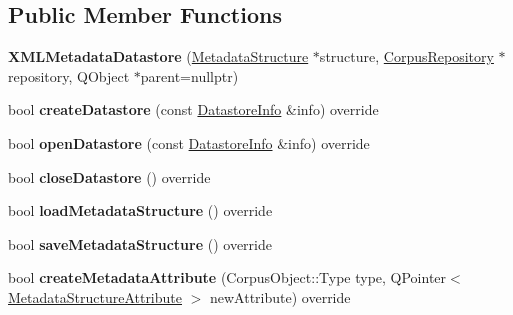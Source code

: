 \subsection*{Public Member Functions}
\begin{DoxyCompactItemize}
\item 
\mbox{\label{class_x_m_l_metadata_datastore_a1f990239b086258a4dbd5f70a4e66daf}} 
{\bfseries X\+M\+L\+Metadata\+Datastore} (\hyperlink{class_metadata_structure}{Metadata\+Structure} $\ast$structure, \hyperlink{class_corpus_repository}{Corpus\+Repository} $\ast$repository, Q\+Object $\ast$parent=nullptr)
\item 
\mbox{\label{class_x_m_l_metadata_datastore_aa6400d415ec4967ec83e2fca309143a3}} 
bool {\bfseries create\+Datastore} (const \hyperlink{class_datastore_info}{Datastore\+Info} \&info) override
\item 
\mbox{\label{class_x_m_l_metadata_datastore_aadeabc52b42f14af20fccd66e2cebb0e}} 
bool {\bfseries open\+Datastore} (const \hyperlink{class_datastore_info}{Datastore\+Info} \&info) override
\item 
\mbox{\label{class_x_m_l_metadata_datastore_ae0a7e5222115f773f4b56cfe80a381a2}} 
bool {\bfseries close\+Datastore} () override
\item 
\mbox{\label{class_x_m_l_metadata_datastore_ac09c925e904379d14fafe1c8f561ceab}} 
bool {\bfseries load\+Metadata\+Structure} () override
\item 
\mbox{\label{class_x_m_l_metadata_datastore_a5b8a6ff4209e730979bee09dc485e699}} 
bool {\bfseries save\+Metadata\+Structure} () override
\item 
\mbox{\label{class_x_m_l_metadata_datastore_ab16bc09234b78eb54566d61b4eb45f10}} 
bool {\bfseries create\+Metadata\+Attribute} (Corpus\+Object\+::\+Type type, Q\+Pointer$<$ \hyperlink{class_metadata_structure_attribute}{Metadata\+Structure\+Attribute} $>$ new\+Attribute) override
\item 
\mbox{\label{class_x_m_l_metadata_datastore_aeea6d7f4e2a2335310baaebb10fced95}} 

\end{DoxyCompactItemize}
